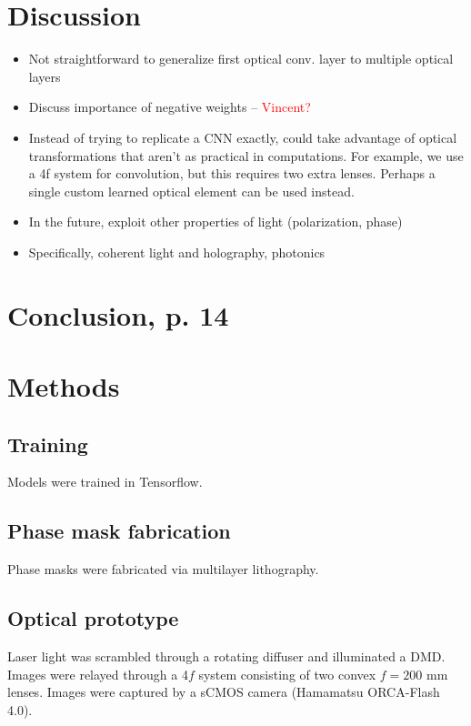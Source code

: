 \documentclass[fleqn,10pt]{wlscirep}
\newcommand{\red}[1]{\textcolor{red}{#1}}
\begin{document}
\section*{Discussion}
\label{sec:discussion}
\begin{itemize}
\item Not straightforward to generalize first optical conv. layer to multiple optical layers
\item Discuss importance of negative weights – \red{Vincent?}
\item Instead of trying to replicate a CNN exactly, could take advantage of optical transformations that aren't as practical in computations. For example, we use a 4f system for convolution, but this requires two extra lenses. Perhaps a single custom learned optical element can be used instead.
\item In the future, exploit other properties of light (polarization, phase)	
\item Specifically, coherent light and holography, photonics
\end{itemize}

\section*{Conclusion, p. 14}
\label{sec:conclusion}


\section*{Methods}
\subsection*{Training}
Models were trained in Tensorflow.

\subsection*{Phase mask fabrication}
Phase masks were fabricated via multilayer lithography.

\subsection*{Optical prototype}
Laser light was scrambled through a rotating diffuser and illuminated a DMD. Images were relayed through a 4$f$ system consisting of two convex $f = 200$ mm lenses. Images were captured by a sCMOS camera (Hamamatsu ORCA-Flash 4.0).
\end{document}
